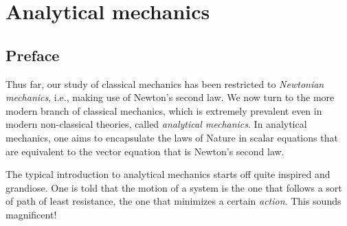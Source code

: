\documentclass{article}
\begin{document}








\newpage

\section*{Analytical mechanics}

\subsection*{Preface}

Thus far, our study of classical mechanics has been restricted to \textit{Newtonian mechanics}, i.e., making use of Newton's second law. We now turn to the more modern branch of classical mechanics, which is extremely prevalent even in modern non-classical theories, called \textit{analytical mechanics}. In analytical mechanics, one aims to encapsulate the laws of Nature in scalar equations that are equivalent to the vector equation that is Newton's second law.

The typical introduction to analytical mechanics starts off quite inspired and grandiose. One is told that the motion of a system is the one that follows a sort of path of least resistance, the one that minimizes a certain \textit{action}. This sounds magnificent!
\end{document}
